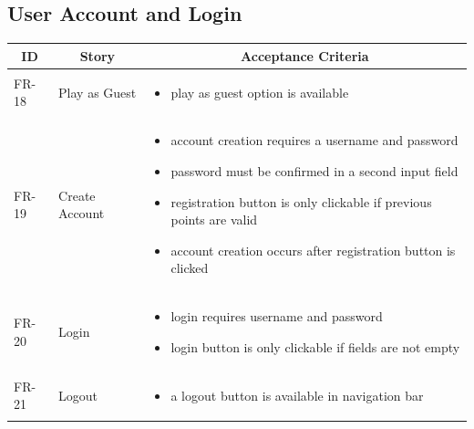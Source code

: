 \subsection{User Account and Login}
\begin{tabular} { | m{1.25cm} | m{5.75cm} | m{6cm} | }
    \hline
    \multicolumn{1}{|c|}{ \textbf{ID}} & \multicolumn{1}{|c|}{ \textbf{Story} } & \multicolumn{1}{|c|}{ \textbf{Acceptance Criteria} } \\
    \hline
    FR-18 & Play as Guest & \begin{itemize}[-]
        \item play as guest option is available
    \end{itemize}\\
    \hline
    FR-19 & Create Account & \begin{itemize}[-]
        \item account creation requires a username and password
        \item password must be confirmed in a second input field
        \item registration button is only clickable if previous points are valid
        \item account creation occurs after registration button is clicked
    \end{itemize}\\
    \hline
    FR-20 & Login & \begin{itemize}[-]
        \item login requires username and password
        \item login button is only clickable if fields are not empty
    \end{itemize}\\
    \hline
    FR-21 & Logout & \begin{itemize}[-]
        \item a logout button is available in navigation bar
    \end{itemize} \\
    \hline
\end{tabular}


